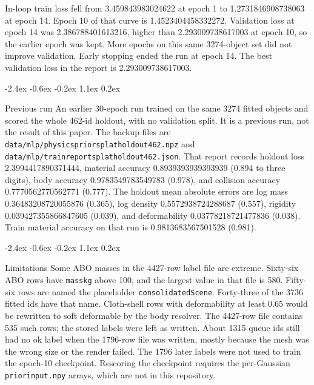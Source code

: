 \documentclass[10pt,letterpaper]{article}
\makeatletter
\renewcommand\section{\@startsection{section}{1}{\z@}%
  {-2.4ex \@plus -0.6ex \@minus -0.2ex}%
  {1.1ex \@plus 0.2ex}%
  {\large\bfseries\raggedright}}
\DeclareRobustCommand{\_}{\textunderscore\allowbreak}
\makeatother
\begin{document}
In-loop train loss fell from 3.459843983024622 at epoch 1 to 1.2731846908738063 at epoch 14.
Epoch 10 of that curve is 1.4523404458332272.
Validation loss at epoch 14 was 2.386788401613216, higher than 2.293009738617003 at epoch 10, so the earlier epoch was kept.
More epochs on this same 3274-object set did not improve validation.
Early stopping ended the run at epoch 14.
The best validation loss in the report is 2.293009738617003.

\section{Previous run}
An earlier 30-epoch run trained on the same 3274 fitted objects and scored the whole 462-id holdout, with no validation split.
It is a previous run, not the result of this paper.
The backup files are \texttt{data/mlp/physics\_prior\_splat\_holdout462.npz} and \texttt{data/mlp/train\_report\_splat\_holdout462.json}.
That report records holdout loss 2.3994417890371444, material accuracy 0.8939393939393939 (0.894 to three digits), body accuracy 0.9783549783549783 (0.978), and collision accuracy 0.7770562770562771 (0.777).
The holdout mean absolute errors are log mass 0.36483208720055876 (0.365), log density 0.5572938724288687 (0.557), rigidity 0.039427355866847605 (0.039), and deformability 0.03778218721477836 (0.038).
Train material accuracy on that run is 0.9813683567501528 (0.981).

\section{Limitations}
Some ABO masses in the 4427-row label file are extreme.
Sixty-six ABO rows have \texttt{mass\_kg} above 100, and the largest value in that file is 580.
Fifty-six rows are named the placeholder \texttt{consolidatedScene}.
Forty-three of the 3736 fitted ids have that name.
Cloth-shell rows with deformability at least 0.65 would be rewritten to soft deformable by the body resolver.
The 4427-row file contains 535 such rows; the stored labels were left as written.
About 1315 queue ids still had no ok label when the 1796-row file was written, mostly because the mesh was the wrong size or the render failed.
The 1796 later labels were not used to train the epoch-10 checkpoint.
Rescoring the checkpoint requires the per-Gaussian \texttt{prior\_input.npy} arrays, which are not in this repository.
\end{document}
